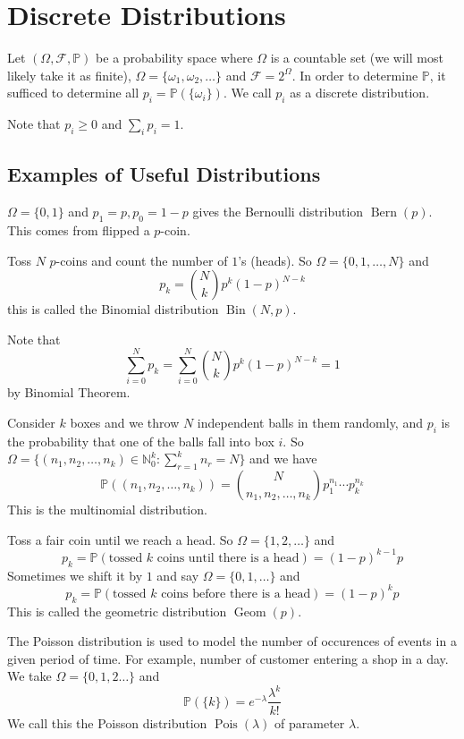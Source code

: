 \section{Discrete Distributions}
\begin{definition}
    Let $(\Omega,\mathscr F,\mathbb P)$ be a probability space where $\Omega$ is a countable set (we will most likely take it as finite), $\Omega=\{\omega_1,\omega_2,\ldots\}$ and $\mathscr F=2^\Omega$.
    In order to determine $\mathbb P$, it sufficed to determine all $p_i=\mathbb P(\{\omega_i\})$.
    We call $p_i$ as a discrete distribution.
\end{definition}
Note that $p_i\ge 0$ and $\sum_ip_i=1$.
\subsection{Examples of Useful Distributions}
\begin{definition}
    $\Omega=\{0,1\}$ and $p_1=p,p_0=1-p$ gives the Bernoulli distribution $\operatorname{Bern}(p)$.
    This comes from flipped a $p$-coin.
\end{definition}
\begin{definition}
    Toss $N$ $p$-coins and count the number of $1$'s (heads).
    So $\Omega=\{0,1,\ldots,N\}$ and
    $$p_k=\binom{N}{k}p^k(1-p)^{N-k}$$
    this is called the Binomial distribution $\operatorname{Bin}(N,p)$.
\end{definition}
Note that
$$\sum_{i=0}^Np_k=\sum_{i=0}^N\binom{N}{k}p^k(1-p)^{N-k}=1$$
by Binomial Theorem.
\begin{definition}
    Consider $k$ boxes and we throw $N$ independent balls in them randomly, and $p_i$ is the probability that one of the balls fall into box $i$.
    So $\Omega=\{(n_1,n_2,\ldots,n_k)\in\mathbb N_0^k:\sum_{r=1}^kn_r=N\}$ and we have
    $$\mathbb P((n_1,n_2,\ldots,n_k))=\binom{N}{n_1,n_2,\ldots,n_k}p_1^{n_1}\cdots p_k^{n_k}$$
    This is the multinomial distribution.
\end{definition}
\begin{definition}
    Toss a fair coin until we reach a head.
    So $\Omega=\{1,2,\ldots\}$ and
    $$p_k=\mathbb P(\text{tossed $k$ coins until there is a head})=(1-p)^{k-1}p$$
    Sometimes we shift it by $1$ and say $\Omega=\{0,1,\ldots\}$ and
    $$p_k=\mathbb P(\text{tossed $k$ coins before there is a head})=(1-p)^kp$$
    This is called the geometric distribution $\operatorname{Geom}(p)$.
\end{definition}
\begin{definition}
    The Poisson distribution is used to model the number of occurences of events in a given period of time.
    For example, number of customer entering a shop in a day.\\
    We take $\Omega=\{0,1,2\ldots\}$ and
    $$\mathbb P(\{k\})=e^{-\lambda}\frac{\lambda^k}{k!}$$
    We call this the Poisson distribution $\operatorname{Pois}(\lambda)$ of parameter $\lambda$.
\end{definition}
